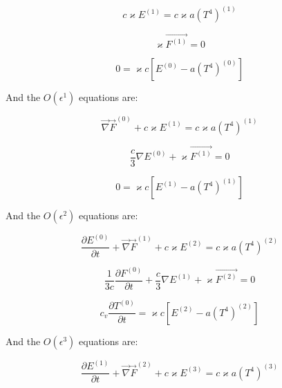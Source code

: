 \documentclass{template}
\begin{document}
\begin{equation}\label{eq:o0-energy}
  c\varkappa E^{(1)} = c\varkappa a \left(T^4 \right)^{(1)}
\end{equation}

\begin{equation}\label{eq:o0-flux}
   \varkappa \vec{F^{(1)}} = 0
\end{equation}

\begin{equation}\label{eq:o0-material}
  0 = \varkappa c \left[ E^{(0)} - a \left( T^4 \right)^{(0)} \right] 
\end{equation}


And the $O(\epsilon^1)$ equations are:

\begin{equation}\label{eq:o1-energy}
   \vec{\nabla}\vec{F}^{(0)} + c\varkappa E^{(1)} = c\varkappa a \left(T^4 \right)^{(1)}
\end{equation}

\begin{equation}\label{eq:o1-flux}
   \frac{c}{3}\nabla E^{(0)} + \varkappa \vec{F^{(1)}} = 0
\end{equation}

\begin{equation}\label{eq:o1-material}
  0 = \varkappa c \left[ E^{(1)} - a \left( T^4 \right)^{(1)} \right] 
\end{equation}

And the $O(\epsilon^2)$ equations are:

\begin{equation}\label{eq:o2-energy}
   \frac{\partial E^{(0)}}{\partial t} + \vec{\nabla}\vec{F}^{(1)} + c\varkappa E^{(2)} = c\varkappa a \left(T^4 \right)^{(2)}
\end{equation}

\begin{equation}\label{eq:o2-flux}
  \frac{1}{3c}\frac{\partial F^{(0)}}{\partial t} + \frac{c}{3}\nabla E^{(1)} + \varkappa \vec{F^{(2)}} = 0
\end{equation}

\begin{equation}\label{eq:o2-material}
  c_v \frac{\partial T^{(0)}}{\partial t} = \varkappa c \left[ E^{(2)} - a \left( T^4 \right)^{(2)} \right] 
\end{equation}

And the $O(\epsilon^3)$ equations are:

\begin{equation}\label{eq:o3-energy}
   \frac{\partial E^{(1)}}{\partial t} + \vec{\nabla}\vec{F}^{(2)} + c\varkappa E^{(3)} = c\varkappa a \left(T^4 \right)^{(3)}
\end{equation}
\end{document}
